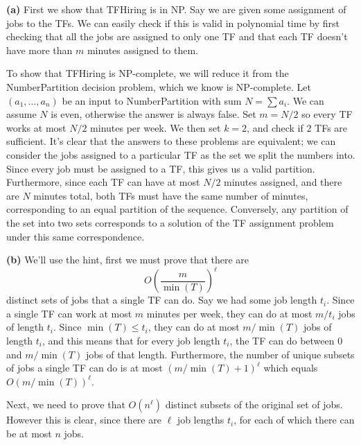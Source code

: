 \documentclass[11pt,letterpaper]{article}
\begin{document}
\begin{solution}
    \textbf{(a)} First we show that \textsf{TFHiring} is in NP. Say we are given some assignment of jobs to the TFs. We can easily check if this is valid in polynomial time by first checking that all the jobs are assigned to only one TF and that each TF doesn't have more than $m$ minutes assigned to them.

    To show that \textsf{TFHiring} is NP-complete, we will reduce it from the \textsf{NumberPartition} decision problem, which we know is NP-complete. Let $(a_1,\ldots,a_n)$ be an input to \textsf{NumberPartition} with sum $N=\sum a_i$. We can assume $N$ is even, otherwise the answer is always false. Set $m=N/2$ so every TF works at most $N/2$ minutes per week. We then set $k=2$, and check if $2$ TFs are sufficient. It's clear that the answers to these problems are equivalent; we can consider the jobs assigned to a particular TF as the set we split the numbers into. Since every job must be assigned to a TF, this gives us a valid partition. Furthermore, since each TF can have at most $N/2$ minutes assigned, and there are $N$ minutes total, both TFs must have the same number of minutes, corresponding to an equal partition of the sequence. Conversely, any partition of the set into two sets corresponds to a solution of the TF assignment problem under this same correspondence.

    \textbf{(b)} We'll use the hint, first we must prove that there are
    \[
        O\left(\frac{m}{\min(T)}\right)^\ell
    \] 
    distinct sets of jobs that a single TF can do. Say we had some job length $t_i$. Since a single TF can work at most $m$ minutes per week, they can do at most $m/t_i$ jobs of length $t_i$. Since $\min(T)\leq t_i$, they can do at most $m/\min(T)$ jobs of length $t_i$, and this means that for every job length $t_i$, the TF can do between $0$ and $m/\min(T)$ jobs of that length. Furthermore, the number of unique subsets of jobs a single TF can do is at most $\left(m/\min(T)+1\right)^\ell$ which equals $O(m/\min(T))^\ell$.

    Next, we need to prove that $O(n^\ell)$ distinct subsets of the original set of jobs. However this is clear, since there are $\ell$ job lengths $t_i$, for each of which there can be at most $n$ jobs.


\end{solution}
\end{document}
